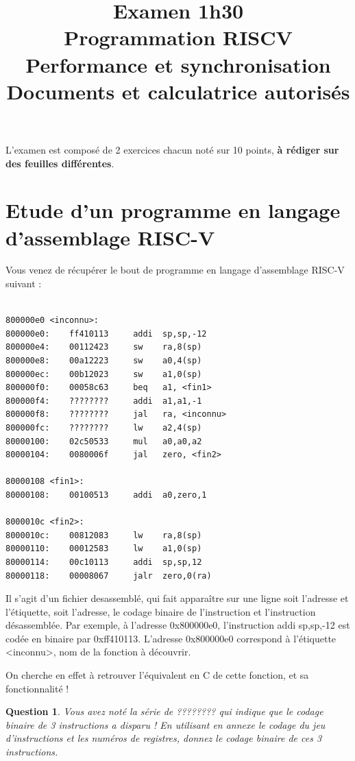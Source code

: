 \documentclass[a4paper, 11pt]{article}
\date{\relax}
\title{\Large{\textbf{Examen 1h30\\Programmation RISCV\\Performance et synchronisation\\Documents et calculatrice autorisés}}}
\author{}
\newtheorem{question}{Question}
\begin{document}
\maketitle
\thispagestyle{fancy}



L'examen est composé de 2 exercices chacun noté sur 10 points, \textbf{à rédiger sur des feuilles différentes}.


\section{Etude d'un programme en langage d'assemblage RISC-V}

Vous venez de récupérer le bout de programme en langage d'assemblage RISC-V suivant :

\begin{lstlisting}

800000e0 <inconnu>:
800000e0:    ff410113     addi  sp,sp,-12
800000e4:    00112423     sw    ra,8(sp)
800000e8:    00a12223     sw    a0,4(sp)
800000ec:    00b12023     sw    a1,0(sp)
800000f0:    00058c63     beq   a1, <fin1>
800000f4:    ????????     addi  a1,a1,-1
800000f8:    ????????     jal   ra, <inconnu>
800000fc:    ????????     lw    a2,4(sp)
80000100:    02c50533     mul   a0,a0,a2
80000104:    0080006f     jal   zero, <fin2>

80000108 <fin1>:
80000108:    00100513     addi  a0,zero,1

8000010c <fin2>:
8000010c:    00812083     lw    ra,8(sp)
80000110:    00012583     lw    a1,0(sp)
80000114:    00c10113     addi  sp,sp,12
80000118:    00008067     jalr  zero,0(ra)

\end{lstlisting}

Il s'agit d'un fichier desassemblé, qui fait apparaître sur une ligne soit
l'adresse et l'étiquette, soit l'adresse, le codage binaire de l'instruction et l'instruction désassemblée.
Par exemple, à l'adresse 0x800000e0, l'instruction addi sp,sp,-12 est codée en binaire par 0xff410113.
L'adresse 0x800000e0 correspond à l'étiquette <inconnu>, nom de la fonction à découvrir.

On cherche en effet à retrouver l'équivalent en C de cette fonction, et sa fonctionnalité !


\begin{question}
Vous avez noté la série de ???????? qui indique que le codage binaire de 3 instructions a disparu !
En utilisant en annexe le codage du jeu d'instructions et les numéros de registres, donnez le codage binaire de ces 3 instructions.
\end{question}
\end{document}
